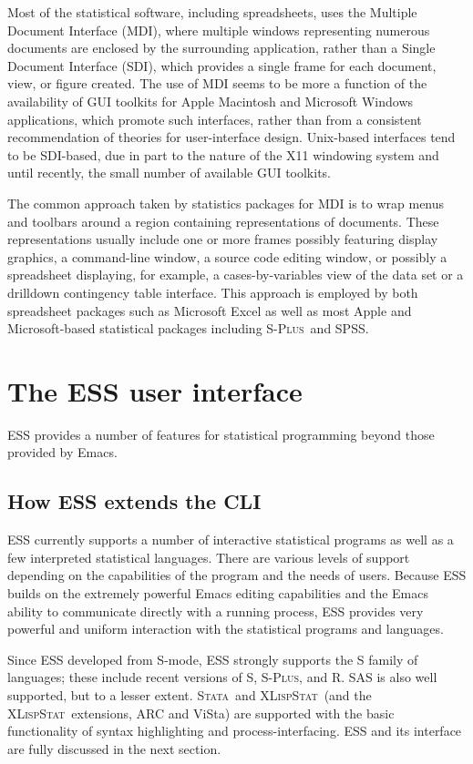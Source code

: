 \documentclass{article}
\newcommand*{\Splus}{\textsc{S-Plus}}
\newcommand*{\XLispStat}{\textsc{XLispStat}}
\newcommand*{\Stata}{\textsc{Stata}}
\begin{document}
Most of the statistical software, including spreadsheets, uses the
Multiple Document Interface (MDI), where multiple windows representing
numerous documents are enclosed by the surrounding application, rather
than a Single Document Interface (SDI), which provides a single frame
for each document, view, or figure created.  The use of MDI seems to
be more a function of the availability of GUI toolkits for Apple
Macintosh and Microsoft Windows applications, which promote such
interfaces, rather than from a consistent recommendation of theories
for user-interface design.  Unix-based interfaces tend to be
SDI-based, due in part to the nature of the X11 windowing system and
until recently, the small number of available GUI toolkits.

The common approach taken by statistics packages for MDI is to wrap
menus and toolbars around a region containing representations of
documents.  These representations usually include one or more frames
possibly featuring display graphics, a command-line window, a source
code editing window, or possibly a spreadsheet displaying, for
example, a cases-by-variables view of the data set or a drilldown
contingency table interface.  This approach is employed by both
spreadsheet packages such as Microsoft Excel as well as most Apple and
Microsoft-based statistical packages including \Splus\ and SPSS.

\section{The ESS user interface}
\label{sec:ESS}

ESS provides a number of features for statistical programming beyond
those provided by Emacs.

\subsection{How ESS extends the CLI}
\label{sec:ESS:UI}

ESS currently supports a number of interactive statistical programs as
well as a few interpreted statistical languages.  There are various
levels of support depending on the capabilities of the program and the
needs of users.  Because ESS builds on the extremely powerful Emacs
editing capabilities and the Emacs ability to communicate directly
with a running process, ESS provides very powerful and uniform
interaction with the statistical programs and languages.

Since ESS developed from S-mode, ESS strongly supports the S family of
languages; these include recent versions of S, \Splus, and R.  SAS is
also well supported, but to a lesser extent.  \Stata\ and \XLispStat\ 
(and the \XLispStat\ extensions, ARC and ViSta) are supported with the
basic functionality of syntax highlighting and process-interfacing.
ESS and its interface are fully discussed in the next section.
\end{document}
